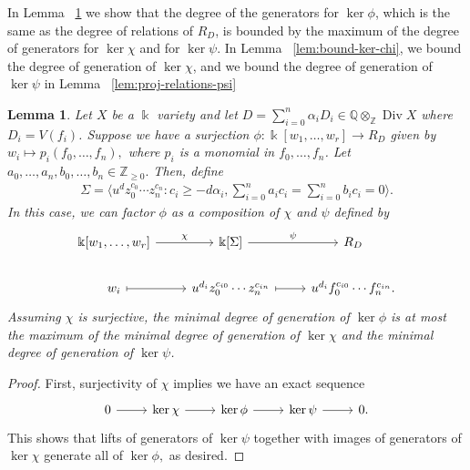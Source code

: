 \documentclass{amsart}
\theoremstyle{plain}
\newtheorem{lem}[thm]{Lemma}
\theoremstyle{definition}
\theoremstyle{remark}
\numberwithin{equation}{subsection}
\newcommand\bq{{\mathbb Q}}
\newcommand\bz{{\mathbb Z}}
\newcommand\bk{{\Bbbk}}
\DeclareMathOperator\di{Div}
\newcommand\bida{a}
\newcommand\bidb{b}
\begin{document}
In Lemma ~\ref{lem:composite-map} we show that the degree of the
generators for $\ker \phi$, which is the same as the degree of relations
of $R_D$, is bounded by the maximum of the degree of generators for
$\ker \chi$ and for $\ker \psi$.
In Lemma ~\ref{lem:bound-ker-chi}, we bound the degree of generation of
$\ker \chi $, and we bound the degree of generation of $\ker \psi$ in Lemma ~\ref{lem:proj-relations-psi}

\begin{lem}
\label{lem:composite-map}
Let $X$ be a $\bk$ variety and let $D = \sum_{i=0}^{n}\alpha_i D_i\in \bq \otimes_\bz \di X$ where $D_i = V(f_i)$. Suppose we have a
surjection $\phi\colon \bk[w_1,\ldots, w_r] \rightarrow R_D$ given by $w_i
\mapsto p_i(f_0, \ldots, f_n),$ where $p_i$ is a monomial in $f_0,\ldots, f_n$.
Let $\bida_0, \ldots, \bida_n, \bidb_0, \ldots, \bidb_n \in \bz_{\geq 0}.$
Then, define
\begin{align*}
	\Sigma = \langle u^d z_0^{c_0} \cdots z_n^{c_n} : c_i \geq -d \alpha_i, \sum_{i=0}^{n} \bida_i c_i = \sum_{i=0}^{n} \bidb_i c_i = 0 \rangle. 
\end{align*}
In this case, we can factor $\phi$ as a composition of $\chi$ and $\psi$ defined by
\[
\begin{tikzcd}
\bk[w_1,\ldots, w_r] \ar {r}{\chi} & \bk[\Sigma] \ar {r}{\psi} & R_D \\
w_i \arrow[mapsto]{r} & u^{d_i}z_0^{c_{i0}} \cdots z_n^{c_{in}} \arrow[mapsto]{r} & u^{d_i}f_0^{c_{i0}} \cdots f_n^{c_{in}}.
\end{tikzcd}
\]
Assuming $\chi$ is surjective, the minimal degree of generation of $\ker \phi$
is at most the maximum of the minimal degree of generation of $\ker \chi$ and
the minimal degree of generation of $\ker \psi$.
\end{lem}

\begin{proof}
First, surjectivity of $\chi$ implies we have an exact sequence
\[
\begin{tikzcd}
0 \ar {r} & \ker \chi \ar{r} & \ker \phi \ar {r} & \ker \psi \ar r & 0.
\end{tikzcd}
\]
This shows that lifts of generators of $\ker \psi$ together with images of
generators of $\ker \chi$ generate all of $\ker \phi,$ as desired. 
\end{proof}
\end{document}
